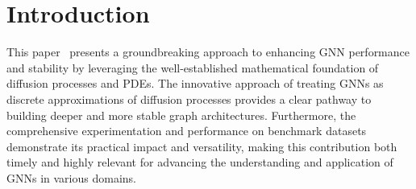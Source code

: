 \documentclass[12pt]{article}
\begin{document}
\section{Introduction}
This paper~\cite{chamberlain} presents a groundbreaking approach to enhancing GNN performance and stability by leveraging the well-established mathematical foundation of diffusion processes and PDEs. The innovative approach of treating GNNs as discrete approximations of diffusion processes provides a clear pathway to building deeper and more stable graph architectures. Furthermore, the comprehensive experimentation and performance on benchmark datasets demonstrate its practical impact and versatility, making this contribution both timely and highly relevant for advancing the understanding and application of GNNs in various domains.



\end{document}
